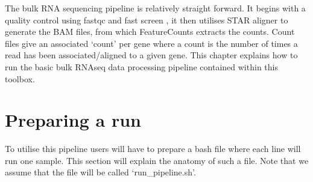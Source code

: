 \label{chap:RNAseq}
The bulk RNA sequencing pipeline is relatively straight forward. It begins with a quality control using fastqc \cite{fastqc} and fast screen \cite{fast_screen}, it then utilises STAR aligner \cite{star} to generate the BAM files, from which FeatureCounts \cite{liao2014featurecounts} extracts the counts. Count files give an associated `count' per gene where a count is the number of times a read has been associated/aligned to a given gene. This chapter explains how to run the basic bulk RNAseq data processing pipeline contained within this toolbox.

\section{Preparing a run \label{sec:run_prep_RNA}}
To utilise this pipeline users will have to prepare a bash file where each line will run one sample. This section will explain the anatomy of such a file. Note that we assume that the file will be called `run\_pipeline.sh'.

